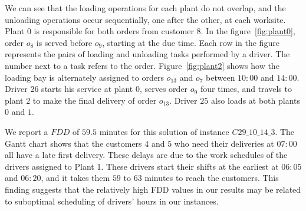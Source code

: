 \documentclass{article}
\begin{document}
We can see that the loading operations for each plant do not overlap, and the unloading operations occur sequentially, one after the other, at each worksite. Plant $0$ is responsible for both orders from customer $8$. In the figure~\ref*{fig:plant0}, order $o_8$ is served before $o_9$, starting at the due time. Each row in the figure represents the pairs of loading and unloading tasks performed by a driver. The number next to a task refers to the order.  Figure~\ref*{fig:plant2} shows how the loading bay is alternately assigned to orders $o_{13}$ and $o_7$ between $10:00$ and $14:00$. Driver $26$ starts his service at plant $0$, serves order $o_9$ four times, and travels to plant $2$ to make the final delivery of order $o_{13}$. Driver $25$ also loads at both plants $0$ and $1$.

We report a $FDD$ of $59.5$ minutes for this solution of instance $C29\_10\_14\_3$. The Gantt chart shows that the customers $4$ and $5$ who need their deliveries at $07:00$ all have a late first delivery. These delays are due to the work schedules of the drivers assigned to Plant 1. These drivers start their shifts at the earliest at $06:05$ and $06:20$, and it takes them $59$ to $63$ minutes to reach the customers. This finding suggests that the relatively high FDD values in our results may be related to suboptimal scheduling of drivers' hours in our instances.
\end{document}
